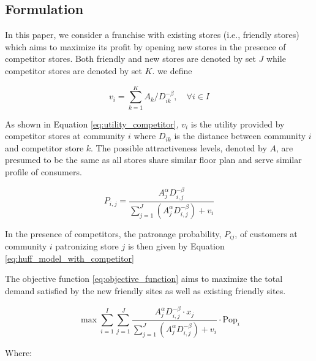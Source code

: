 \documentclass{ecai}
\begin{document}
\subsection{Formulation}
In this paper, we consider a franchise with existing stores (i.e., friendly stores) which aims to maximize its profit by opening new stores in the presence of competitor stores. Both friendly and new stores are denoted by set $J$ while competitor stores are denoted by set $K$. we define

\begin{equation}
v_i = \sum_{k=1}^{K} A_k / D_{ik}^{-\beta}, \quad \forall i \in I
\label{eq:utility_competitor}
\end{equation}

As shown in Equation \ref{eq:utility_competitor}, $v_i$ is the utility provided by competitor stores at community $i$ where $D_{ik}$ is the distance between community $i$ and competitor store $k$. The possible attractiveness levels, denoted by $A$, are presumed to be the same as all stores share similar floor plan and serve similar profile of consumers. 

\begin{equation}
P_{i,j} = \frac{A_j^{\alpha}D_{i,j}^{-\beta}}{\sum_{j=1}^{J} (A_j^{\alpha}D_{i,j}^{-\beta}) + v_i}
\label{eq:huff_model_with_competitor}
\end{equation}

In the presence of competitors, the patronage probability, $P_{ij}$,  of customers at community $i$ patronizing store $j$ is then given by Equation \ref{eq:huff_model_with_competitor}

The objective function \ref{eq:objective_function} aims to maximize the total demand satisfied by the new friendly sites as well as existing friendly sites.

\begin{equation}
\max \sum_{i=1}^{I} \sum_{j=1}^{J} \frac{A_j^{\alpha} D_{i,j}^{-\beta} \cdot x_j}{\sum_{j=1}^{J} (A_j^{\alpha} D_{i,j}^{-\beta}) + v_i} \cdot \text{Pop}_i
\label{eq:objective_function}
\end{equation}

Where:
\end{document}
